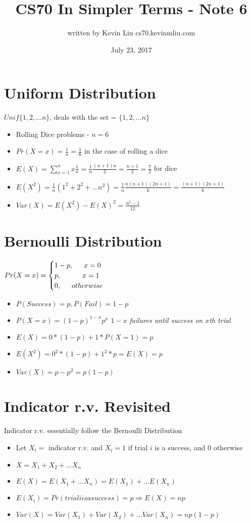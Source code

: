 \documentclass[a4paper]{article}
\title{CS70 In Simpler Terms - Note 6}
\author{written by Kevin Liu cs70.kevinmliu.com}
\date{July 23, 2017}
\begin{document}
\maketitle

\section{Uniform Distribution}
$Unif\{1,2,...n\}$, deals with the set = $\{1,2, ... n\}$
\begin{itemize}
    \item Rolling Dice problems - $n = 6$
    \item $Pr(X=x) = \frac{1}{n} = \frac{1}{6}$ in the case of rolling a dice
    \item $E(X) = \sum_{x=1}^n x\frac{1}{n} = \frac{1}{n}\frac{(n+1)n}{2} =\frac{n+1}{2} = \frac{7}{2}$ for dice
    \item $E(X^2) = \frac{1}{n}(1^2 + 2^2 + ... n^2) = \frac{1}{n}\frac{n(n+1)(2n+1)}{6} =\frac{(n+1)(2n+1)}{6}$
    \item $Var(X) = E(X^2) - E(X)^2 = \frac{n^2 -1}{12}$
\end{itemize}

\section{Bernoulli Distribution}
$Pr(X=x) =
\begin{cases}
1-p,\indent x=0\\
p, \indent\indent x = 1\\
0,\indent otherwise
\end{cases}$
\begin{itemize}
    \item $P(Success) = p, P(Fail) = 1-p$ 
    \item $P(X=x) = (1-p)^{1-x}p^x$ \textit{$1-x$ failures until success on $x$th trial}
    \item $E(X) = 0 * (1-p) + 1*P(X=1) = p$
    \item $E(X^2) = 0^2 * (1-p) + 1^2*p = E(X) = p$
    \item $Var(X) = p - p^2 = p(1-p)$
\end{itemize}

\section{Indicator r.v. Revisited}
Indicator r.v. essentially follow the Bernoulli Distribution
\begin{itemize}
    \item Let $X_i = $ indicator r.v. and $X_i = 1$ if trial $i$ is a success, and $0$ otherwise
    \item $X = X_1 + X_2 + ... X_n$
    \item $E(X) = E(X_1 + ... X_n) = E(X_1) + ... E(X_n)$
    \item $E(X_i) = Pr(trial i is a success) = p \Rightarrow E(X) = np$
    \item $Var(X) = Var(X_1) + Var(X_2) +... Var(X_n) = np(1-p)$
\end{itemize}
\end{document}
